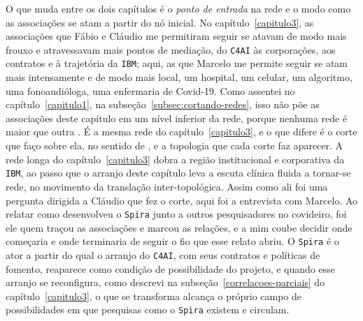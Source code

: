 O que muda entre os dois capítulos é o \textit{ponto de entrada} na rede e o modo como as associações se atam a partir do nó inicial. No capítulo~\ref{capitulo3}, as associações que Fábio e Cláudio me permitiram seguir se atavam de modo mais frouxo e atravessavam mais pontos de mediação, do \texttt{C4AI} às corporações, aos contratos e à trajetória da \texttt{IBM}; aqui, as que Marcelo me permite seguir se atam mais intensamente e de modo mais local, um hospital, um celular, um algoritmo, uma fonoaudióloga, uma enfermaria de Covid-19. Como assentei no capítulo~\ref{capitulo1}, na subseção~\ref{subsec:cortando-redes}, isso não põe as associações deste capítulo em um nível inferior da rede, porque nenhuma rede é maior que outra \parencite[p.~5]{latour1996clarifications}. É a mesma rede do capítulo~\ref{capitulo3}, e o que difere é o corte que faço sobre ela, no sentido de \textcite{strathern2011cortando}, e a topologia que cada corte faz aparecer. A rede longa do capítulo~\ref{capitulo3} dobra a região institucional e corporativa da \texttt{IBM}, ao passo que o arranjo deste capítulo leva a escuta clínica fluida a tornar-se rede, no movimento da translação inter-topológica. Assim como ali foi uma pergunta dirigida a Cláudio que fez o corte, aqui foi a entrevista com Marcelo. Ao relatar como desenvolveu o \texttt{Spira} junto a outros pesquisadores no covideiro, foi ele quem traçou as associações e marcou as relações, e a mim coube decidir onde começaria e onde terminaria de seguir o fio que esse relato abriu. O \texttt{Spira} é o ator a partir do qual o arranjo do \texttt{C4AI}, com seus contratos e políticas de fomento, reaparece como condição de possibilidade do projeto, e quando esse arranjo se reconfigura, como descrevi na subseção~\ref{correlacoes-parciais} do capítulo~\ref{capitulo3}, o que se transforma alcança o próprio campo de possibilidades em que pesquisas como o \texttt{Spira} existem e circulam.

